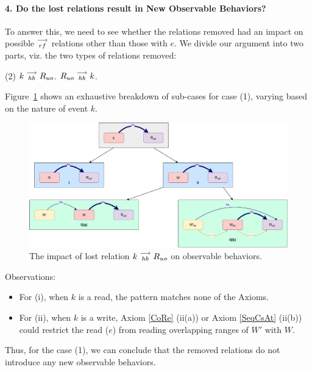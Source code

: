 \paragraph{4. Do the lost relations result in New Observable Behaviors?}

        To answer this, we need to see whether the relations removed had an impact on possible $\stackrel{\longrightarrow}{_{rf}}$ relations other than those with $e$. 
        We divide our argument into two parts, viz. the two types of relations removed:
        \begin{tasks}[style=enumerate](2)
            \task $k\stackrel{\longrightarrow}{_{hb}}R_{uo}$. 
            \task $R_{uo}\stackrel{\longrightarrow}{_{hb}}k$.
        \end{tasks}

        Figure~\ref{elim_read:case1} shows an exhaustive breakdown of sub-cases for case (1), varying based
        on the nature of event $k$.
        \begin{figure}[H]
            \centering
            \includegraphics[scale=0.5]{5.Elimination/1.ValidEliminationCandidate/ReadElimProof/ProofParts/Part4_Case1.pdf}
            \caption{The impact of lost relation $k\stackrel{\longrightarrow}{_{hb}}R_{uo}$ on observable behaviors.}
            \label{elim_read:case1}
        \end{figure}

        Observations:
        \begin{itemize}
            \item For (i), when $k$ is a read, the pattern matches none of the Axioms.
            \item For (ii), when $k$ is a write, Axiom \ref{CoRe} (ii(a)) or Axiom \ref{SeqCsAt} (ii(b)) could restrict the read ($e$) from reading overlapping ranges of $W'$ with $W$.
        \end{itemize}

        Thus, for the case (1), we can conclude that the removed relations do not introduce any new observable behaviors.

